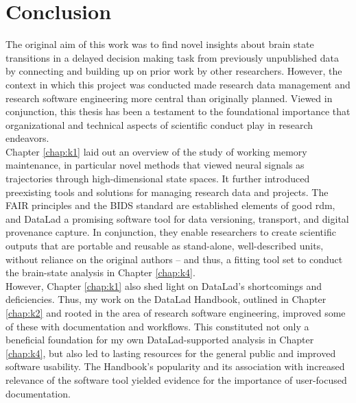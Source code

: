 

\chapter{Conclusion}
\label{discussion}

The original aim of this work was to find novel insights about brain state transitions in a delayed decision making task from previously unpublished data by connecting and building up on prior work by other researchers.
However, the context in which this project was conducted made research data management and research software engineering more central than originally planned.
Viewed in conjunction, this thesis has been a testament to the foundational importance that organizational and technical aspects of scientific conduct play in research endeavors.\\
Chapter \ref{chap:k1} laid out an overview of the study of working memory maintenance, in particular novel methods that viewed neural signals as trajectories through high-dimensional state spaces.
It further introduced preexisting tools and solutions for managing research data and projects.
The \gls{FAIR} principles and the \gls{BIDS} standard are established elements of good \gls{rdm}, and DataLad a promising software tool for data versioning, transport, and digital provenance capture.
In conjunction, they enable researchers to create scientific outputs that are portable and reusable as stand-alone, well-described units, without reliance on the original authors -- and thus, a fitting tool set to conduct the brain-state analysis in Chapter \ref{chap:k4}.\\
However, Chapter \ref{chap:k1} also shed light on DataLad's shortcomings and deficiencies.
Thus, my work on the DataLad Handbook, outlined in Chapter \ref{chap:k2} and rooted in the area of research software engineering, improved some of these with documentation and workflows.
This constituted not only a beneficial foundation for my own DataLad-supported analysis in Chapter \ref{chap:k4}, but also led to lasting resources for the general public and improved software usability.
The Handbook's popularity and its association with increased relevance of the software tool yielded evidence for the importance of user-focused documentation.
